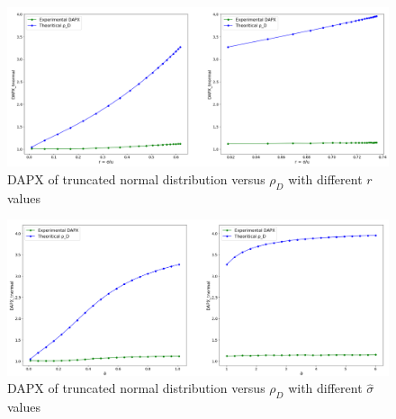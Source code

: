 \begin{figure}[H]
	\centering
	\includegraphics[width=1\textwidth]{tnorm_dapx_r}
	\caption{DAPX of truncated normal distribution versus $\rho_{D}$ with different $r$ values}
	\label{fig:tnorm_dapx_r}
\end{figure}
\begin{figure}[H]
	\centering
	\includegraphics[width=1\textwidth]{tnorm_dapx_s}
	\caption{DAPX of truncated normal distribution versus $\rho_{D}$ with different $\hat{\sigma}$ values}
	\label{fig:tnorm_dapx_s}
\end{figure}

